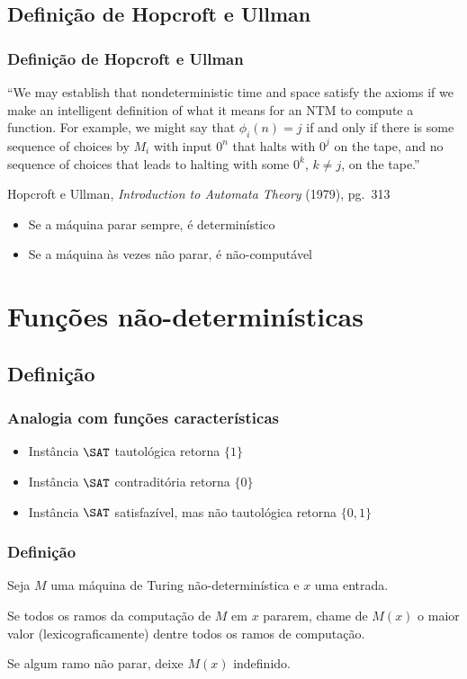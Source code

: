 \documentclass[utf8,notheorems]{beamer}
\theoremstyle{definition}
\begin{document}
\subsection{Definição de Hopcroft e Ullman}
\begin{frame}
    \frametitle{Definição de Hopcroft e Ullman}
    ``We may establish that nondeterministic time and space
    satisfy the axioms if we make an intelligent definition of what it means
    for an NTM to compute a function.
    For example, we might say that $\phi_i(n) = j$
    if and only if there is some sequence of choices by $M_i$ with input $0^n$
    that halts with $0^j$ on the tape,
    and no sequence of choices that leads to halting with some $0^k$, $k \neq j$,
    on the tape.''

    {\scriptsize
        Hopcroft e Ullman, \emph{Introduction to Automata Theory} (1979), pg.~313
    }

    \pause
    \begin{itemize}
        \item Se a máquina parar sempre, é determinístico
        \item Se a máquina às vezes não parar, é não-computável
    \end{itemize}
\end{frame}

\section{Funções não-determinísticas}

\subsection{Definição}
\begin{frame}
    \frametitle{Analogia com funções características}
    \begin{itemize}
        \item Instância $\SAT$ tautológica retorna $\{1\}$
        \item Instância $\SAT$ contraditória retorna $\{0\}$
        \item Instância $\SAT$ satisfazível, mas não tautológica retorna $\{0, 1\}$
    \end{itemize}
\end{frame}
\begin{frame}
    \frametitle{Definição}
    Seja $M$ uma máquina de Turing não-determinística
    e $x$ uma entrada.

    Se todos os ramos da computação de $M$ em $x$ pararem,
    chame de $M(x)$ o maior valor
    (lexicograficamente)
    dentre todos os ramos de computação.

    Se algum ramo não parar,
    deixe $M(x)$ indefinido.
\end{frame}
\end{document}
